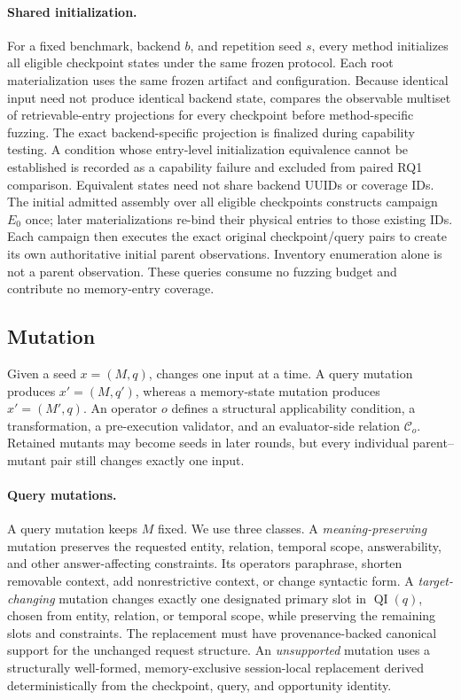 \paragraph{Shared initialization.}
For a fixed benchmark, backend \(b\), and repetition seed \(s\), every method
initializes all eligible checkpoint states under the same frozen protocol.
Each root materialization uses the same frozen artifact and configuration.
Because identical input need not produce identical backend state, \system
compares the observable multiset of
retrievable-entry projections for every checkpoint before method-specific
fuzzing. The exact backend-specific projection is finalized during capability
testing. A condition whose entry-level initialization equivalence cannot be
established is recorded as a capability failure and excluded from paired RQ1
comparison. Equivalent states need not share backend UUIDs or coverage IDs.
The initial admitted assembly over all eligible checkpoints constructs
campaign \(E_0\) once; later
materializations re-bind their physical entries to those existing IDs. Each
campaign then executes the exact original checkpoint/query pairs to create its
own authoritative initial parent observations. Inventory enumeration alone is
not a parent observation. These queries consume no fuzzing budget and
contribute no memory-entry coverage.

\subsection{Mutation}
\label{subsec:mutation}

Given a seed \(x=(M,q)\), \system changes one input at a time. A query mutation
produces \(x'=(M,q')\), whereas a memory-state mutation produces
\(x'=(M',q)\). An operator \(o\) defines a structural applicability condition,
a transformation, a pre-execution validator, and an evaluator-side relation
\(\mathcal{C}_o\). Retained mutants may become seeds in later rounds, but every
individual parent--mutant pair still changes exactly one input.

\paragraph{Query mutations.}
A query mutation keeps \(M\) fixed. We use three classes. A
\emph{meaning-preserving} mutation preserves the requested entity, relation,
temporal scope, answerability, and other answer-affecting constraints. Its
operators paraphrase, shorten removable context, add nonrestrictive context,
or change syntactic form. A \emph{target-changing} mutation changes exactly
one designated primary slot in \(\operatorname{QI}(q)\), chosen from entity,
relation, or temporal scope, while preserving the remaining slots and
constraints. The replacement must have provenance-backed canonical support
for the unchanged request structure. An \emph{unsupported} mutation uses a
structurally well-formed, memory-exclusive session-local replacement derived
deterministically from the checkpoint, query, and opportunity identity.

